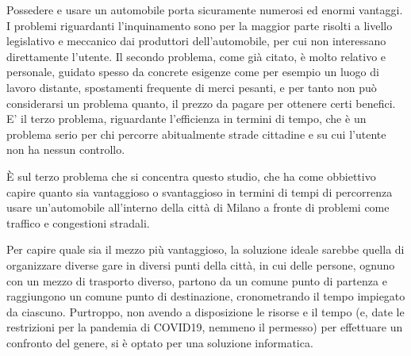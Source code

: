 Possedere e usare un automobile porta sicuramente numerosi ed enormi vantaggi. I problemi riguardanti l'inquinamento sono per la maggior parte risolti a livello legislativo e meccanico dai produttori dell'automobile, per cui non interessano direttamente l'utente. Il secondo problema, come già citato, è molto relativo e personale, guidato spesso da concrete esigenze come per esempio un luogo di lavoro distante, spostamenti frequente di merci pesanti, e per tanto non può considerarsi un problema quanto, il prezzo da pagare per ottenere certi benefici. E' il terzo problema, riguardante l'efficienza in termini di tempo, che è un problema serio per chi percorre abitualmente strade cittadine e su cui l'utente non ha nessun controllo.



È sul terzo problema che si concentra questo studio, che ha come obbiettivo capire quanto sia vantaggioso o svantaggioso in termini di tempi di percorrenza usare un'automobile all'interno della città di Milano a fronte di problemi come traffico e congestioni stradali.




Per capire quale sia il mezzo più vantaggioso, la soluzione ideale sarebbe quella di organizzare diverse gare in diversi punti della città, in cui delle persone, ognuno con un mezzo di trasporto diverso, partono da un comune punto di partenza e raggiungono un comune punto di destinazione, cronometrando il tempo impiegato da ciascuno. Purtroppo, non avendo a disposizione le risorse e il tempo (e, date le restrizioni per la pandemia di COVID19, nemmeno il permesso) per effettuare un confronto del genere, si è optato per una soluzione informatica.

